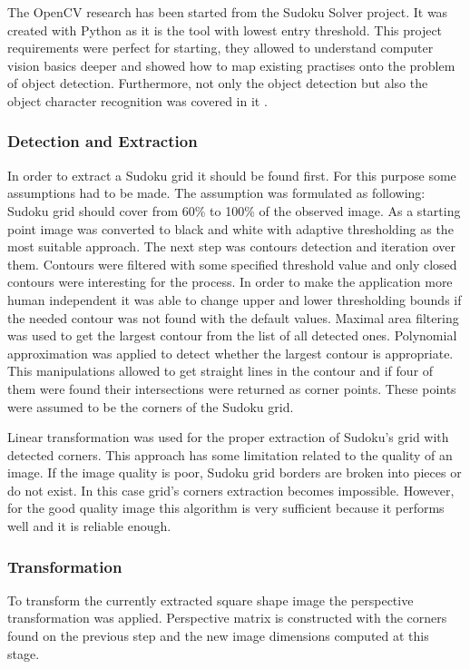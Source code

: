 \documentclass[../../main]{subfiles}
\begin{document}
The \ac{OpenCV} research has been started from the Sudoku Solver project. It was created with Python as it is the tool with lowest entry threshold. This project requirements were perfect for starting, they allowed to understand computer vision basics deeper and showed how to map existing practises onto the problem of object detection. Furthermore, not only the object detection but also the object character recognition was covered in it \cite{sudoku_solver_zakharov}. 

\subsubsection{Detection and Extraction}

In order to extract a Sudoku grid it should be found first. For this purpose some assumptions had to be made. The assumption was formulated as following: Sudoku grid should cover from 60\% to 100\% of the observed image. As a starting point image was converted to black and white with adaptive thresholding as the most suitable approach. The next step was contours detection and iteration over them. Contours were filtered with some specified threshold value and only closed contours were interesting for the process. In order to make the application more human independent it was able to change upper and lower thresholding bounds if the needed contour was not found with the default values. Maximal area filtering was used to get the largest contour from the list of all detected ones. Polynomial approximation was applied to detect whether the largest contour is appropriate. This manipulations allowed to get straight lines in the contour and if four of them were found their intersections were returned as corner points. These points were assumed to be the corners of the Sudoku grid.

Linear transformation was used for the proper extraction of Sudoku's grid with detected corners. This approach has some limitation related to the quality of an image. If the image quality is poor, Sudoku grid borders are broken into pieces or do not exist. In this case grid's corners extraction becomes impossible. However, for the good quality image this algorithm is very sufficient because it performs well and it is reliable enough.

\subsubsection{Transformation}

To transform the currently extracted square shape image the perspective transformation was applied. Perspective matrix is constructed with the corners found on the previous step and the new image dimensions computed at this stage.
\end{document}
